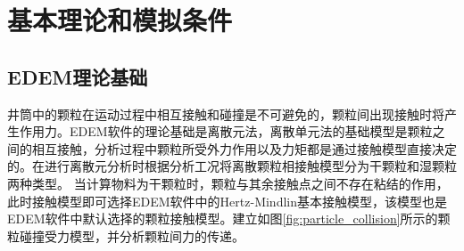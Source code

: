 \section{基本理论和模拟条件}  
\subsection{EDEM理论基础} 
井筒中的颗粒在运动过程中相互接触和碰撞是不可避免的，颗粒间出现接触时将产生作用力。EDEM软件的理论基础是离散元法，离散单元法的基础模型是颗粒之间的相互接触，分析过程中颗粒所受外力作用以及力矩都是通过接触模型直接决定的。在进行离散元分析时根据分析工况将离散颗粒相接触模型分为干颗粒和湿颗粒两种类型。
当计算物料为干颗粒时，颗粒与其余接触点之间不存在粘结的作用，此时接触模型即可选择EDEM软件中的Hertz-Mindlin基本接触模型，该模型也是EDEM软件中默认选择的颗粒接触模型。建立如图\ref{fig:particle_collision}所示的颗粒碰撞受力模型，并分析颗粒间力的传递。

